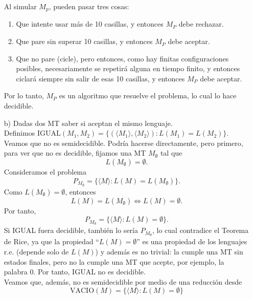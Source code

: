 \begin{ejercicio}
\begin{itemize}
        Al simular $M_p$, pueden pasar tres cosas:
        \begin{enumerate}
            \item Que intente usar más de 10 casillas, y entonces $M_P$ debe rechazar.
            \item Que pare sin superar 10 casillas, y entonces $M_P$ debe aceptar.
            \item Que no pare (cicle), pero entonces, como hay finitas
            configuraciones posibles, necesariamente se repetirá alguna en tiempo 
            finito, y entonces ciclará siempre sin salir de esas 10 casillas, y entonces
            $M_P$ debe aceptar.
        \end{enumerate}

        Por lo tanto, $M_P$ es un algoritmo que resuelve el problema, lo cual lo hace decidible.

        

        \item[b)] Dadas dos MT saber si aceptan el mismo lenguaje. \\ 
        
        Definimos $\text{IGUAL}(M_1, M_2) = \{(\langle M_1 \rangle, \langle M_2 \rangle) : L(M_1) = L(M_2)\}$. Veamos 
        que no es semidecidible. Podría hacerse directamente, pero primero, para ver que no es decidible, 
        fijamos una MT $M_{\emptyset}$ tal que $$L(M_{\emptyset})=\emptyset.$$ Consideramos el problema
        $$P_{M_{\emptyset}}=\{\langle M\rangle : L(M)=L(M_{\emptyset})\}.$$ Como $L(M_{\emptyset})=\emptyset$, 
        entonces $$L(M)=L(M_{\emptyset}) \iff L(M)=\emptyset.$$ Por tanto, 
        $$P_{M_{\emptyset}}=\{\langle M\rangle : L(M)=\emptyset\}.$$
        Si IGUAL fuera decidible, también lo sería $P_{M_{\emptyset}}$, lo cual contradice el Teorema de Rice, 
        ya que la propiedad ``$L(M)=\emptyset$'' es una propiedad de los lenguajes r.e. (depende solo de $L(M)$) y 
        además es no trivial: la cumple una MT sin estados finales, pero no la cumple una MT que acepte, por ejemplo, 
        la palabra $0$. Por tanto, IGUAL no es decidible. \\

        Veamos que, además, no es semidecidible por medio de una reducción desde
        $$\text{VACIO}(M) = \{\langle M \rangle : L(M) = \emptyset\}$$


\end{itemize}
\end{ejercicio}
